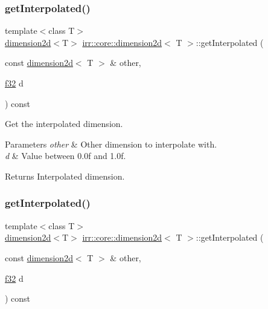 \subsubsection{\texorpdfstring{get\+Interpolated()}{getInterpolated()}\hspace{0.1cm}{\footnotesize\ttfamily [1/2]}}
{\footnotesize\ttfamily template$<$class T$>$ \\
\hyperlink{classirr_1_1core_1_1dimension2d}{dimension2d}$<$T$>$ \hyperlink{classirr_1_1core_1_1dimension2d}{irr\+::core\+::dimension2d}$<$ T $>$\+::get\+Interpolated (\begin{DoxyParamCaption}\item[{const \hyperlink{classirr_1_1core_1_1dimension2d}{dimension2d}$<$ T $>$ \&}]{other,  }\item[{\hyperlink{namespaceirr_a0277be98d67dc26ff93b1a6a1d086b07}{f32}}]{d }\end{DoxyParamCaption}) const\hspace{0.3cm}{\ttfamily [inline]}}



Get the interpolated dimension. 


\begin{DoxyParams}{Parameters}
{\em other} & Other dimension to interpolate with. \\
\hline
{\em d} & Value between 0.\+0f and 1.\+0f. \\
\hline
\end{DoxyParams}
\begin{DoxyReturn}{Returns}
Interpolated dimension. 
\end{DoxyReturn}
\mbox{\label{classirr_1_1core_1_1dimension2d_a30981123f90a2221acd85c1fe4364eee}} 
\subsubsection{\texorpdfstring{get\+Interpolated()}{getInterpolated()}\hspace{0.1cm}{\footnotesize\ttfamily [2/2]}}
{\footnotesize\ttfamily template$<$class T$>$ \\
\hyperlink{classirr_1_1core_1_1dimension2d}{dimension2d}$<$T$>$ \hyperlink{classirr_1_1core_1_1dimension2d}{irr\+::core\+::dimension2d}$<$ T $>$\+::get\+Interpolated (\begin{DoxyParamCaption}\item[{const \hyperlink{classirr_1_1core_1_1dimension2d}{dimension2d}$<$ T $>$ \&}]{other,  }\item[{\hyperlink{namespaceirr_a0277be98d67dc26ff93b1a6a1d086b07}{f32}}]{d }\end{DoxyParamCaption}) const\hspace{0.3cm}{\ttfamily [inline]}}



